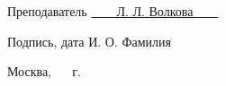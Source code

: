 \begin{titlepage}
\vspace{0.5cm}

\fontsize{12pt}{12pt}\selectfont
\noindent\textnormal{Преподаватель} \hspace{52mm}
\underline{\textnormal{\hphantom{~~~~~~~~~~~~~~~~~~~~~~~~~~~}}} \hspace{14mm}
\noindent\underline{\textnormal{~~~~Л. Л. Волкова~~~~}}

\vspace{2mm}
\noindent\textnormal{\hphantom{Студент}} \hspace{17mm}\noindent
\fontsize{8pt}{8pt}
\hphantom{Группа}\hspace{43mm}\textnormal{Подпись, дата} \hspace{30mm}\noindent\textnormal{И. О. Фамилия}

\vspace{0.5cm}

\fontsize{12pt}{12pt}\selectfont

\begin{center}
	\vfill
	Москва, ~\the\year
	~г.
\end{center}
\restoregeometry

\end{titlepage}
